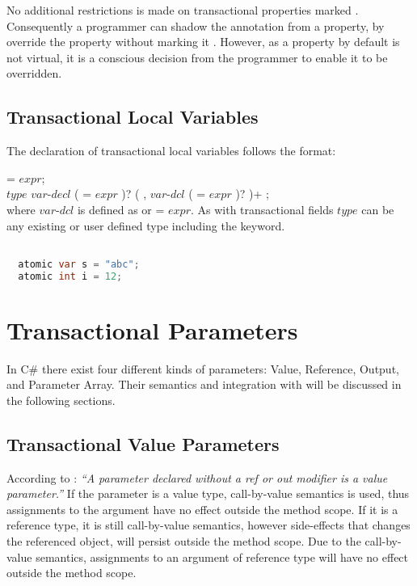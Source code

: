 No additional restrictions is made on transactional properties marked . Consequently a programmer can shadow the  annotation from a property, by override the property without marking it . However, as a property by default is not virtual, it is a conscious decision from the programmer to enable it to be overridden.

\subsection{Transactional Local Variables}\label{subsec:local_variables}
The declaration of transactional local variables follows the format:

   = $expr$;\\
 $type$ $var$-$decl$ ( = $expr$ )? ( , $var$-$dcl$ ( = $expr$ )? )+ ;\\

where $var$-$dcl$ is defined as  or  = $expr$. As with transactional fields $type$ can be any existing or user defined type including the  keyword.
\begin{lstlisting}[label=lst:local_variable,
  caption={Local Transactional Variable},
  language=Java,  
  showspaces=false,
  showtabs=false,
  breaklines=true,
  showstringspaces=false,
  breakatwhitespace=true,
  commentstyle=\color{greencomments},
  keywordstyle=\color{bluekeywords},
  stringstyle=\color{redstrings},
  morekeywords={atomic, retry, orElse, var, get, set}]  % Start your code-block

  atomic var s = "abc";
  atomic int i = 12;  
\end{lstlisting}

\section{Transactional Parameters}\label{sec:parameter_design}
In C\# there exist four different kinds of parameters: Value, Reference, Output, and Parameter Array. Their semantics and integration with \stmnamesp will be discussed in the following sections.

\subsection{Transactional Value Parameters}
\label{subsec:stm_desgin_value_parameters}
According to \cite[p. 97]{csharp2013specificaiton}: \textit{``A parameter declared without a ref or out modifier is a value parameter.''} If the parameter is a value type, call-by-value semantics is used, thus assignments to the argument have no effect outside the method scope. If it is a reference type, it is still call-by-value semantics, however side-effects that changes the referenced object, will persist outside the method scope. Due to the call-by-value semantics, assignments to an argument of reference type will have no effect outside the method scope\cite[p. 76]{sestoft2011c}.

